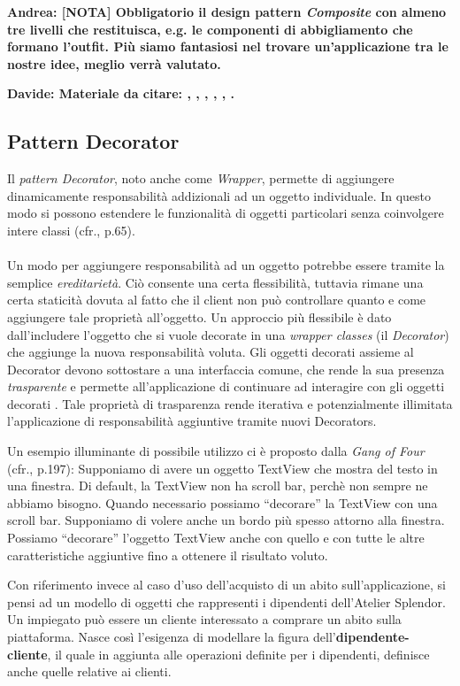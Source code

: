 \documentclass[12pt]{article}
\newcommand{\andrea}[1]{{\bf \color{mauve} Andrea: #1 }}
\newcommand{\davide}[1]{{\bf \color{chromeyellow} Davide: #1 }}
\begin{document}
\andrea{\textbf{[NOTA]} Obbligatorio il design pattern {\em Composite} con almeno tre livelli che restituisca, e.g. le componenti di abbigliamento che formano l'outfit. Più siamo fantasiosi nel trovare un'applicazione tra le nostre idee, meglio verrà valutato.}


\davide{Materiale da citare: \cite{gof_riferimento}, \cite{up-riferimento}, \cite{uml_riferimento}, \cite{elicitation_tools}, \cite{gof_sunt}, \cite{github}.}


\subsection{Pattern Decorator}

Il {\em pattern Decorator}, noto anche come {\em Wrapper}, permette di aggiungere dinamicamente responsabilità addizionali ad un oggetto individuale. In questo modo si possono estendere le funzionalità di oggetti particolari senza coinvolgere intere classi (cfr.\cite{gof_sunt}, p.65).
\\
\\
Un modo per aggiungere responsabilità ad un oggetto potrebbe essere tramite la semplice {\em ereditarietà}. Ciò consente una certa flessibilità, tuttavia rimane una certa staticità dovuta al fatto che il client non può controllare quanto e come aggiungere tale proprietà all'oggetto.
Un approccio più flessibile è dato dall'includere l'oggetto che si vuole decorate in una {\em wrapper classes} (il {\em Decorator}) che aggiunge la nuova responsabilità voluta. Gli oggetti decorati assieme al Decorator devono sottostare a una interfaccia comune, che rende la sua presenza {\em trasparente} e permette all’applicazione di continuare ad interagire con gli oggetti decorati \cite{gof_sunt}. Tale proprietà di trasparenza rende iterativa e potenzialmente illimitata l'applicazione di responsabilità aggiuntive tramite nuovi Decorators.

Un esempio illuminante di possibile utilizzo ci è proposto dalla {\em Gang of Four} (cfr.\cite{gof_riferimento}, p.197):
Supponiamo di avere un oggetto TextView che mostra del testo in una finestra. Di default, la TextView non ha scroll bar, perchè non sempre ne abbiamo bisogno. Quando necessario possiamo ``decorare'' la TextView con una scroll bar. Supponiamo di volere anche un bordo più spesso attorno alla finestra. Possiamo ``decorare'' l'oggetto TextView anche con quello e con tutte le altre caratteristiche aggiuntive fino a ottenere il risultato voluto.

Con riferimento invece al caso d'uso dell'acquisto di un abito sull'applicazione, si pensi ad un modello di oggetti che rappresenti i dipendenti dell'Atelier Splendor. Un impiegato può essere un cliente interessato a comprare un abito sulla piattaforma. Nasce così l'esigenza di modellare la figura dell'\textbf{dipendente-cliente}, il quale in aggiunta alle operazioni definite per i dipendenti, definisce anche quelle relative ai clienti.
\end{document}
